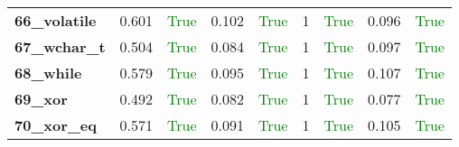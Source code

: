 \documentclass{article}
\begin{document}
\begin{xltabular}{\textwidth}{lcccccccc}
\textbf{66\_volatile}& 0.601&\textcolor{green}{True}& 0.102&\textcolor{green}{True}& 1&\textcolor{green}{True}& 0.096&\textcolor{green}{True} \\[0.5ex]
\textbf{67\_wchar\_t}& 0.504&\textcolor{green}{True}& 0.084&\textcolor{green}{True}& 1&\textcolor{green}{True}& 0.097&\textcolor{green}{True} \\[0.5ex]
\textbf{68\_while}& 0.579&\textcolor{green}{True}& 0.095&\textcolor{green}{True}& 1&\textcolor{green}{True}& 0.107&\textcolor{green}{True} \\[0.5ex]
\textbf{69\_xor}& 0.492&\textcolor{green}{True}& 0.082&\textcolor{green}{True}& 1&\textcolor{green}{True}& 0.077&\textcolor{green}{True} \\[0.5ex]
\textbf{70\_xor\_eq}& 0.571&\textcolor{green}{True}& 0.091&\textcolor{green}{True}& 1&\textcolor{green}{True}& 0.105&\textcolor{green}{True} \\[0.5ex]
\bottomrule
\end{xltabular}
\newpage
\end{document}
